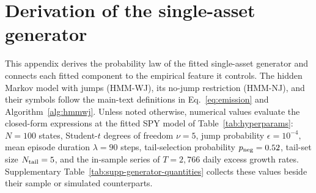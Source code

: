 \begin{table}[tbp]
\centering
\caption{\textbf{Descriptive statistics and stylized-facts tests for
    SPY daily excess growth rates.} In-sample (IS): $2014$--$2024$
    ($T = 2{,}766$); out-of-sample (OoS): $2025$ ($T = 249$).
    Gaussian and Laplace columns show maximum likelihood estimation
    (MLE) fits to the in-sample data. We used the Jarque--Bera (JB)
    normality test and the Ljung--Box (LB) autocorrelation test at lag
    $20$. $^{\ast}$ denotes rejection at
    $\alpha = 0.05$.}
\label{tab:descriptive_stats}
\small
{}
\end{table}

\section{Derivation of the single-asset generator}
\label{sec:supp-generator}

This appendix derives the probability law of the fitted single-asset
generator and connects each fitted component to the empirical feature
it controls. The hidden Markov model with jumps (HMM-WJ), its no-jump
restriction (HMM-NJ), and their symbols follow the main-text
definitions in Eq.~\eqref{eq:emission} and
Algorithm~\ref{alg:hmmwj}. Unless noted otherwise, numerical values
evaluate the closed-form expressions at the fitted SPY model of
Table~\ref{tab:hyperparams}: $N = 100$ states, Student-$t$ degrees of
freedom $\nu = 5$, jump probability $\epsilon = 10^{-4}$, mean episode
duration $\lambda = 90$ steps, tail-selection probability
$p_{\rm neg} = 0.52$, tail-set size $N_{\rm tail} = 5$, and the
in-sample series of $T = 2{,}766$ daily excess growth rates.
Supplementary Table~\ref{tab:supp-generator-quantities} collects these values
beside their sample or simulated counterparts.

